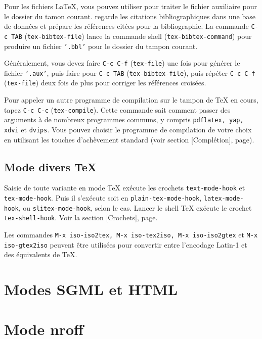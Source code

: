 Pour les fichiers \LaTeX{}, vous pouvez utiliser  pour
traiter le fichier auxiliaire pour le dossier du tamon
courant.  regarde les citations bibliographiques dans une
base de données et prépare les références citées pour la
bibliographie. La commande \texttt{C- c TAB}
(\texttt{tex-bibtex-file}) lance la commande shell
(\texttt{tex-bibtex-command}) pour produire un fichier \texttt{'.bbl'}
pour le dossier du tampon courant.

Généralement, vous devez faire \texttt{C-c C-f} (\texttt{tex-file})
une fois pour générer le fichier \texttt{'.aux'}, puis faire pour
\texttt{C-c TAB} (\texttt{tex-bibtex-file}), puis répéter \texttt{C-c
  C-f} (\texttt{tex-file}) deux fois de plus pour corriger les
références croisées.

Pour appeler un autre programme de compilation sur le tampon de \TeX{}
en cours, tapez \texttt{C-c C-c} (\texttt{tex-compile}). Cette
commande sait comment passer des arguments à de nombreux programmes
communs, y compris \texttt{pdflatex, yap, xdvi} et
\texttt{dvips}. Vous pouvez choisir le programme de compilation de
votre choix en utilisant les touches d'achèvement standard (voir
section [Complétion], page). 



\subsection{Mode divers \TeX{}}

Saisie de toute variante en mode \TeX{} exécute les crochets
\texttt{text-mode-hook} et \texttt{tex-mode-hook}. Puis il s'exécute
soit en \texttt{plain-tex-mode-hook}, \texttt{latex-mode-hook}, ou
\texttt{slitex-mode-hook}, selon le cas. Lancer le shell \TeX{}
exécute le crochet \texttt{tex-shell-hook}. Voir la
section [Crochets], page.

Les commandes \texttt{M-x iso-iso2tex, M-x iso-tex2iso, M-x
  iso-iso2gtex} et \texttt{M-x iso-gtex2iso} peuvent être utilisées
pour convertir entre l'encodage Latin-1 et des équivalents de \TeX{}.


\section{Modes SGML et HTML}
\section{Mode nroff}
